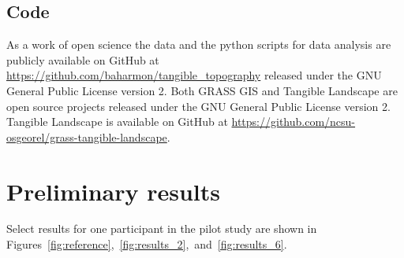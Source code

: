 \documentclass{sigchi}
\begin{document}

\subsection{Code}
As a work of open science 
the data and the python scripts for data analysis are 
publicly available on GitHub at \url{https://github.com/baharmon/tangible_topography}
released under the GNU General Public License version 2. 
Both GRASS GIS and Tangible Landscape 
are open source projects
released under the GNU General Public License version 2. 
Tangible Landscape is available on GitHub at 
\url{https://github.com/ncsu-osgeorel/grass-tangible-landscape}.


\section{Preliminary results}

Select results for one participant in the pilot study are shown in 
Figures~\ref{fig:reference},~\ref{fig:results_2},~and~\ref{fig:results_6}.
\end{document}
